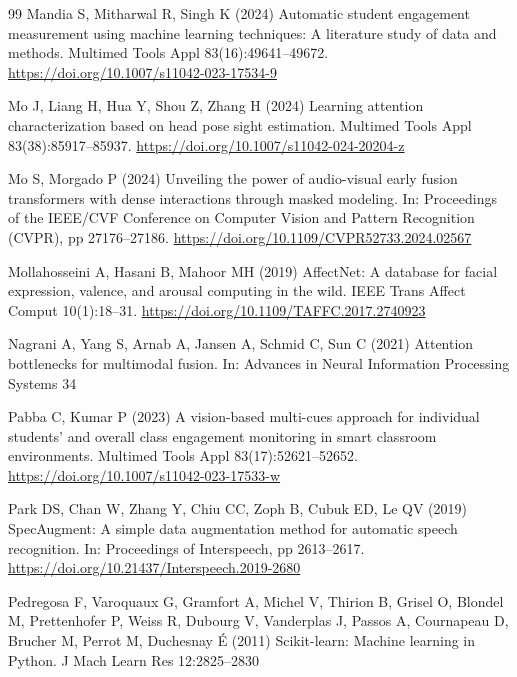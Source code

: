 \documentclass[pdflatex,iicol,sn-basic]{sn-jnl}
\begin{document}
\begin{thebibliography}{99}
Mandia S, Mitharwal R, Singh K (2024) Automatic student engagement measurement using machine learning techniques: A literature study of data and methods. Multimed Tools Appl 83(16):49641--49672. \url{https://doi.org/10.1007/s11042-023-17534-9}

Mo J, Liang H, Hua Y, Shou Z, Zhang H (2024) Learning attention characterization based on head pose sight estimation. Multimed Tools Appl 83(38):85917--85937. \url{https://doi.org/10.1007/s11042-024-20204-z}

Mo S, Morgado P (2024) Unveiling the power of audio-visual early fusion transformers with dense interactions through masked modeling. In: Proceedings of the IEEE/CVF Conference on Computer Vision and Pattern Recognition (CVPR), pp 27176--27186. \url{https://doi.org/10.1109/CVPR52733.2024.02567}

Mollahosseini A, Hasani B, Mahoor MH (2019) AffectNet: A database for facial expression, valence, and arousal computing in the wild. IEEE Trans Affect Comput 10(1):18--31. \url{https://doi.org/10.1109/TAFFC.2017.2740923}

Nagrani A, Yang S, Arnab A, Jansen A, Schmid C, Sun C (2021) Attention bottlenecks for multimodal fusion. In: Advances in Neural Information Processing Systems 34

Pabba C, Kumar P (2023) A vision-based multi-cues approach for individual students' and overall class engagement monitoring in smart classroom environments. Multimed Tools Appl 83(17):52621--52652. \url{https://doi.org/10.1007/s11042-023-17533-w}

Park DS, Chan W, Zhang Y, Chiu CC, Zoph B, Cubuk ED, Le QV (2019) SpecAugment: A simple data augmentation method for automatic speech recognition. In: Proceedings of Interspeech, pp 2613--2617. \url{https://doi.org/10.21437/Interspeech.2019-2680}

Pedregosa F, Varoquaux G, Gramfort A, Michel V, Thirion B, Grisel O, Blondel M, Prettenhofer P, Weiss R, Dubourg V, Vanderplas J, Passos A, Cournapeau D, Brucher M, Perrot M, Duchesnay {\'E} (2011) Scikit-learn: Machine learning in Python. J Mach Learn Res 12:2825--2830


\end{thebibliography}
\end{document}
